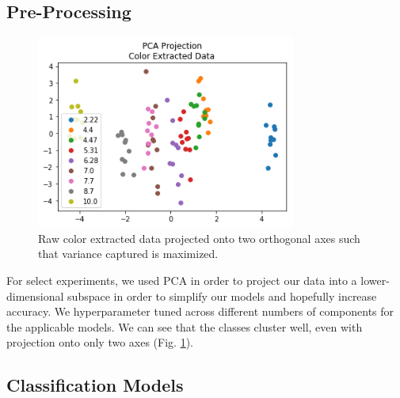 \documentclass[journal]{IEEEtran}
\begin{document}
\subsection{Pre-Processing}
\begin{figure}
\centering
\includegraphics[height=2.5in]{pca.png}
\caption{Raw color extracted data projected onto two orthogonal axes such that variance captured is maximized.}
\label{pca}
\end{figure}

For select experiments, we used PCA in order to project our data into a lower-dimensional subspace in order to simplify our models and hopefully increase accuracy. We hyperparameter tuned across different numbers of components for the applicable models. We can see that the classes cluster well, even with projection onto only two axes (Fig. \ref{pca}).

\subsection{Classification Models}
\end{document}
